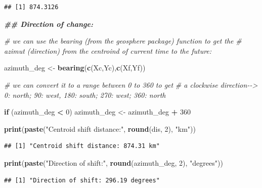 \documentclass[
]{article}
\newenvironment{Shaded}{\begin{snugshade}}{\end{snugshade}}
\newcommand{\CommentTok}[1]{\textcolor[rgb]{0.56,0.35,0.01}{\textit{#1}}}
\newcommand{\ControlFlowTok}[1]{\textcolor[rgb]{0.13,0.29,0.53}{\textbf{#1}}}
\newcommand{\DecValTok}[1]{\textcolor[rgb]{0.00,0.00,0.81}{#1}}
\newcommand{\DocumentationTok}[1]{\textcolor[rgb]{0.56,0.35,0.01}{\textbf{\textit{#1}}}}
\newcommand{\FunctionTok}[1]{\textcolor[rgb]{0.13,0.29,0.53}{\textbf{#1}}}
\newcommand{\NormalTok}[1]{#1}
\newcommand{\OtherTok}[1]{\textcolor[rgb]{0.56,0.35,0.01}{#1}}
\newcommand{\SpecialCharTok}[1]{\textcolor[rgb]{0.81,0.36,0.00}{\textbf{#1}}}
\newcommand{\StringTok}[1]{\textcolor[rgb]{0.31,0.60,0.02}{#1}}
\begin{document}
\begin{verbatim}
## [1] 874.3126
\end{verbatim}

\begin{Shaded}
\begin{Highlighting}[]
\DocumentationTok{\#\# Direction of change:}

\CommentTok{\# we can use the bearing (from the geosphere package) function to get the }
\CommentTok{\# azimut (direction) from the centroind of current time to the future:}


\NormalTok{azimuth\_deg }\OtherTok{\textless{}{-}} \FunctionTok{bearing}\NormalTok{(}\FunctionTok{c}\NormalTok{(Xc,Yc),}\FunctionTok{c}\NormalTok{(Xf,Yf))}

\CommentTok{\# we can convert it to a range between 0 to 360 to get}
\CommentTok{\# a clockwise direction{-}{-}\textgreater{} 0: north; 90: west, 180: south; 270: west; 360: north}

\ControlFlowTok{if}\NormalTok{ (azimuth\_deg }\SpecialCharTok{\textless{}} \DecValTok{0}\NormalTok{) azimuth\_deg }\OtherTok{\textless{}{-}}\NormalTok{ azimuth\_deg }\SpecialCharTok{+} \DecValTok{360}


\FunctionTok{print}\NormalTok{(}\FunctionTok{paste}\NormalTok{(}\StringTok{"Centroid shift distance:"}\NormalTok{, }\FunctionTok{round}\NormalTok{(dis, }\DecValTok{2}\NormalTok{), }\StringTok{"km"}\NormalTok{))}
\end{Highlighting}
\end{Shaded}

\begin{verbatim}
## [1] "Centroid shift distance: 874.31 km"
\end{verbatim}

\begin{Shaded}
\begin{Highlighting}[]
\FunctionTok{print}\NormalTok{(}\FunctionTok{paste}\NormalTok{(}\StringTok{"Direction of shift:"}\NormalTok{, }\FunctionTok{round}\NormalTok{(azimuth\_deg, }\DecValTok{2}\NormalTok{), }\StringTok{"degrees"}\NormalTok{))}
\end{Highlighting}
\end{Shaded}

\begin{verbatim}
## [1] "Direction of shift: 296.19 degrees"
\end{verbatim}
\end{document}
